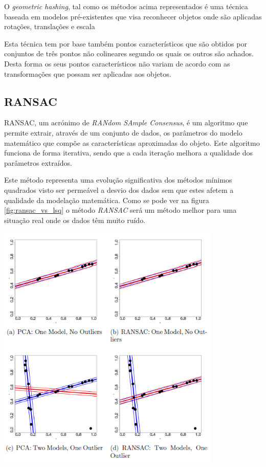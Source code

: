 O \emph{geometric hashing}, tal como os métodos acima representados é uma técnica baseada em modelos pré-existentes que visa reconhecer objetos onde são aplicadas rotações, translações e escala \cite{1989SPIE.1095..515C}

Esta técnica tem por base também pontos característicos que são obtidos por
conjuntos de três pontos não colineares segundo os quais os outros são achados. 
Desta forma os seus pontos característicos não variam de acordo com as 
transformações que possam ser aplicadas aos objetos.



\subsection{RANSAC}

RANSAC\cite{Fischler:1981:RSC:358669.358692}, um acrónimo de \emph{RANdom SAmple Consensus}, é um algoritmo que permite extrair, através de um conjunto de dados, os parâmetros do modelo matemático que compõe as características aproximadas do objeto. Este algoritmo funciona de forma iterativa, sendo que a cada iteração melhora a qualidade dos parâmetros extraídos.

Este método representa uma evolução significativa dos métodos mínimos quadrados visto ser permeável a desvio dos dados sem que estes afetem a qualidade da modelação matemática.
Como se pode ver na figura \ref{fig:ransac_vs_lsq} o método \emph{RANSAC} será um método melhor para uma situação real onde os dados têm muito ruído.


\begin{center}
	\includegraphics[width=0.80\textwidth]{figures/least_squares_vs_ransac.png}
	\label{fig:ransac_vs_lsq}
\end{center}



